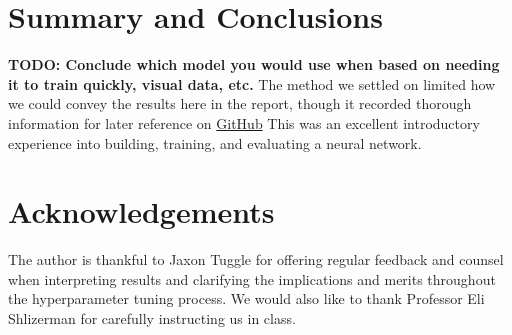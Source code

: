 \documentclass[11pt]{amsart}
\begin{document}


\section{Summary and Conclusions}\label{sec:conclusions} 
\textbf{TODO: Conclude which model you would use when based on needing it to train quickly, visual data, etc. }
The method we settled on limited how we could convey the results here in the report, though it recorded thorough information for later reference on \href{https://github.com/hunter-lybbert/uw-central/blob/main/data_analysis/hw_04/experiments/experiments.json}{GitHub}
This was an excellent introductory experience into building, training, and evaluating a neural network.

\section*{Acknowledgements}
The author is thankful to Jaxon Tuggle for offering regular feedback and counsel when interpreting results and clarifying the implications and merits throughout the hyperparameter tuning process.
We would also like to thank Professor Eli Shlizerman for carefully instructing us in class.


\end{document}
